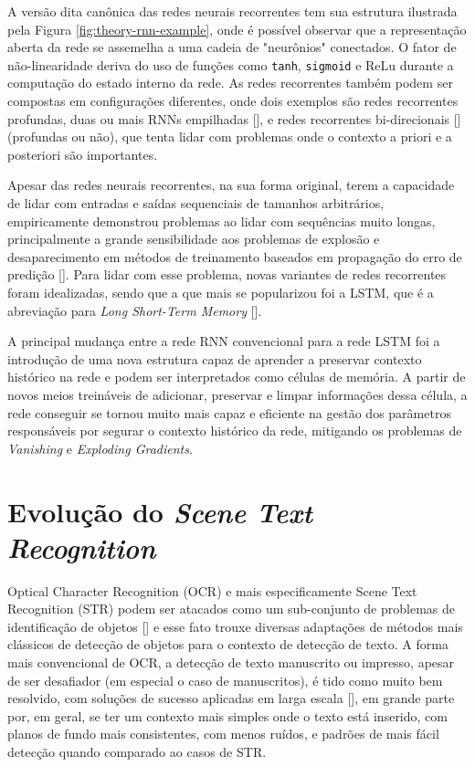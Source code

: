 A versão dita canônica das redes neurais recorrentes tem sua estrutura ilustrada pela Figura \ref{fig:theory-rnn-example}, onde é possível observar que a representação aberta da rede se assemelha a uma cadeia de "neurônios" conectados. O fator de não-linearidade deriva do uso de funções como \texttt{tanh}, \texttt{sigmoid} e ReLu durante a computação do estado interno da rede. As redes recorrentes também podem ser compostas em configurações diferentes, onde dois exemplos são redes recorrentes profundas, duas ou mais RNNs empilhadas [], e redes recorrentes bi-direcionais [] (profundas ou não), que tenta lidar com problemas onde o contexto a priori e a posteriori são importantes.

Apesar das redes neurais recorrentes, na sua forma original, terem a capacidade de lidar com entradas e saídas sequenciais de tamanhos arbitrários, empiricamente demonstrou problemas ao lidar com sequências muito longas, principalmente a grande sensibilidade aos problemas de explosão e desaparecimento em métodos de treinamento baseados em propagação do erro de predição []. Para lidar com esse problema, novas variantes de redes recorrentes foram idealizadas, sendo que a que mais se popularizou foi a LSTM, que é a abreviação para \textit{Long Short-Term Memory} [].

A principal mudança entre a rede RNN convencional para a rede LSTM foi a introdução de uma nova estrutura capaz de aprender a preservar contexto histórico na rede e podem ser interpretados como células de memória. A partir de novos meios treináveis de adicionar, preservar e limpar informações dessa célula, a rede conseguir se tornou muito mais capaz e eficiente na gestão dos parâmetros responsáveis por segurar o contexto histórico da rede, mitigando os problemas de \textit{Vanishing} e \textit{Exploding Gradients}. 


\section{Evolução do \textit{Scene Text Recognition}}
Optical Character Recognition (OCR) e mais especificamente Scene Text Recognition (STR) podem ser atacados como um sub-conjunto de problemas de identificação de objetos [] e esse fato trouxe diversas adaptações de métodos mais clássicos de detecção de objetos para o contexto de detecção de texto. A forma mais convencional de OCR, a detecção de texto manuscrito ou impresso, apesar de ser desafiador (em especial o caso de manuscritos), é tido como muito bem resolvido, com soluções de sucesso aplicadas em larga escala [], em grande parte por, em geral, se ter um contexto mais simples onde o texto está inserido, com planos de fundo mais consistentes, com menos ruídos, e padrões de mais fácil detecção quando comparado ao casos de STR.


